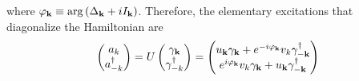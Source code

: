 where $\varphi_{\mathbf{k}} \equiv \arg\left( \Delta_{\mathbf{k}} + iI_{\mathbf{k}} \right)$. Therefore, the elementary excitations that diagonalize the Hamiltonian are
\begin{equation}\label{eq:magnetic-field-elementary-excitation}
\begin{pmatrix}
    a_k \\
    a_{-k}^\dagger 
  \end{pmatrix} 
  = 
  U
    \begin{pmatrix}
     \gamma_{\mathbf{k}} \\
     \gamma^\dagger_{-k} 
    \end{pmatrix} 
    = 
    \begin{pmatrix}
        u_{\mathbf{k}}\gamma_{\mathbf{k}} + e^{-i\varphi_{\mathbf{k}}} v_k \gamma_{-\mathbf{k}}^\dagger \\
        e^{i\varphi_{\mathbf{k}}} v_k \gamma_{\mathbf{k}} + u_{\mathbf{k}} \gamma_{-\mathbf{k}}^\dagger
   \end{pmatrix}
\end{equation}

